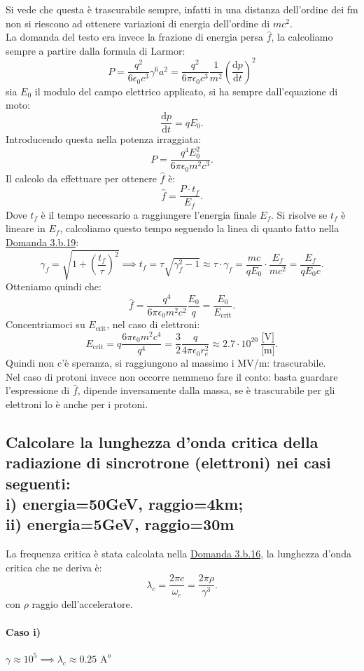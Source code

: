 Si vede che questa è trascurabile sempre, infatti in una distanza dell'ordine dei fm non si riescono ad ottenere variazioni di energia dell'ordine di  $mc^2$.\\
La domanda del testo era invece la frazione di energia persa $\hat{f}$, la calcoliamo sempre a partire dalla formula di Larmor:
\[
	P= \frac{q^2}{6\epsilon_0c^3}\gamma^6 a^2= 
	 \frac{q^2}{6\pi\epsilon_0c^3}\frac{1}{m^2}\left( \frac{\mbox{d} p}{\mbox{d} t}  \right)^2 
\]
sia $E_0$ il modulo del campo elettrico applicato,  si ha sempre dall'equazione di moto:
\[
	\frac{\mbox{d} p}{\mbox{d} t} = qE_0
.\] 
Introducendo questa nella potenza irraggiata:
\[
	P= \frac{q^4E^2_0}{6\pi\epsilon_0m^2c^3}
.\] 
Il calcolo da effettuare per ottenere $\hat{f}$ è:
\[
	\hat{f}= \frac{P\cdot t_f}{E_f}
.\] 
Dove $t_f$ è il tempo necessario a raggiungere l'energia finale $E_f$. Si risolve se $t_f$ è lineare in $E_f $, calcoliamo questo tempo seguendo la linea di quanto fatto nella \hyperref[sec:3.b.19]{Domanda 3.b.19}:
\[
	\gamma_f=\sqrt{1+\left( \frac{t_f}{\tau} \right)^2 } \implies t_f =
	\tau\sqrt{\gamma^2_f-1} \approx \tau \cdot \gamma_f = \frac{mc}{qE_0}\cdot \frac{E_f}{mc^2}= \frac{E_f}{qE_0 c}
.\] 
Otteniamo quindi che:
\[
	\hat{f} = \frac{q^4}{6\pi \epsilon_0m^2c^2}\frac{E_0}{q}=\frac{E_0}{E_{\text{crit}}}
.\] 
Concentriamoci su $E_{\text{crit}}$, nel caso di elettroni:
\[
	E_{\text{crit}}=q \frac{6\pi\epsilon_0m^2c^4}{q^4}= \frac{3}{2}\frac{q}{4\pi\epsilon_0 r_e^2} \approx 2.7 \cdot 10^{20} \ \frac{\text{[V]}}{\text{[m]}}
.\] 
Quindi non c'è speranza, si raggiungono al massimo i MV/m: trascurabile.\\
Nel caso di protoni invece non occorre nemmeno fare il conto: basta guardare l'espressione di $\hat{f}$, dipende inversamente dalla massa, se è trascurabile per gli elettroni lo è anche per i protoni.


\subsection[]{Calcolare la lunghezza d’onda critica della radiazione di sincrotrone (elettroni) nei casi seguenti: \\
i) energia=50GeV, raggio=4km; \\
ii) energia=5GeV, raggio=30m}
\label{sec:3.b.24}
La frequenza critica è stata calcolata nella \hyperref[sec:3.b.16]{Domanda 3.b.16}, la lunghezza d'onda critica che ne deriva è:
\[
	\lambda_c = \frac{2\pi c}{\omega_c} = \frac{2\pi\rho}{\gamma^3} 
.\] 
con $\rho$ raggio dell'acceleratore.
\paragraph{Caso i)}    $\gamma\approx 10^5 \implies \lambda_{c}\approx 0.25 \text{ A}^o$
